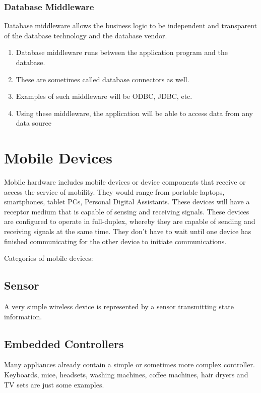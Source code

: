 \subsubsection*{Database Middleware}
Database middleware allows the business logic to be independent and transparent of the database technology and the database vendor.

\begin{multicols}{2}
	\begin{enumerate}
		\item Database middleware runs between the application program and the database. 
		\item These are sometimes called database connectors as well.
		\item Examples of such middleware will be ODBC, JDBC, etc. 
		\item Using these middleware, the application will be able to access data from any data source
	\end{enumerate}
\end{multicols}


\section{Mobile Devices}

Mobile hardware includes mobile devices or device components that receive or access the service of mobility. They would range from portable laptops, smartphones, tablet PCs, Personal Digital Assistants. These devices will have a receptor medium that is capable of sensing and receiving signals. These devices are configured to operate in full-duplex, whereby they are capable of sending and receiving signals at the same time. They don't have to wait until one device has finished communicating for the other device to initiate
communications.

Categories of mobile devices:

\subsection*{Sensor}
A very simple wireless device is represented by a sensor transmitting
state information. 

\subsection*{Embedded Controllers}
Many appliances already contain a simple or sometimes more complex controller. Keyboards, mice, headsets, washing machines, coffee machines, hair dryers and TV sets are just some examples.


